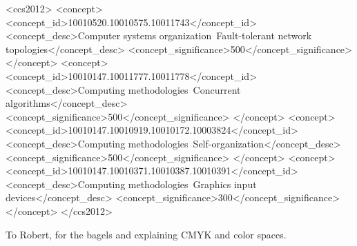 \documentclass[manuscript,screen,review]{acmart}
\begin{document}
\begin{CCSXML}
<ccs2012>
   <concept>
       <concept_id>10010520.10010575.10011743</concept_id>
       <concept_desc>Computer systems organization~Fault-tolerant network topologies</concept_desc>
       <concept_significance>500</concept_significance>
       </concept>
   <concept>
       <concept_id>10010147.10011777.10011778</concept_id>
       <concept_desc>Computing methodologies~Concurrent algorithms</concept_desc>
       <concept_significance>500</concept_significance>
       </concept>
   <concept>
       <concept_id>10010147.10010919.10010172.10003824</concept_id>
       <concept_desc>Computing methodologies~Self-organization</concept_desc>
       <concept_significance>500</concept_significance>
       </concept>
   <concept>
       <concept_id>10010147.10010371.10010387.10010391</concept_id>
       <concept_desc>Computing methodologies~Graphics input devices</concept_desc>
       <concept_significance>300</concept_significance>
       </concept>
 </ccs2012>
\end{CCSXML}




\maketitle









\begin{acks}
To Robert, for the bagels and explaining CMYK and color spaces.
\end{acks}
\end{document}
